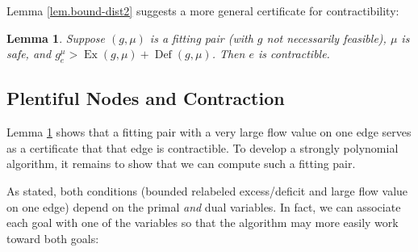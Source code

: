 \documentclass[11pt]{article}
\newtheorem{lemma}[theorem]{Lemma}
\theoremstyle{definition}
\theoremstyle{definition}
\theoremstyle{definition}
\DeclareMathOperator{\Ex}{Ex}
\DeclareMathOperator{\Def}{Def}
\begin{document}
    Lemma \ref{lem.bound-dist2} suggests a more general certificate for contractibility:
    \begin{lemma} \label{lem.contractibility}
    Suppose $(g, \mu)$ is a fitting pair (with $g$ not necessarily feasible),
    $\mu$ is safe, and $g^\mu_e > \Ex(g, \mu) + \Def(g, \mu)$.
    Then $e$ is contractible.
    \end{lemma}

%

	\subsection{Plentiful Nodes and Contraction}
    Lemma \ref{lem.contractibility} shows that a fitting pair with a very
    large flow value on one edge serves as a certificate that that edge is contractible.
    To develop a strongly polynomial algorithm, it remains to show that we can compute
    such a fitting pair.
    
    As stated, both conditions (bounded relabeled excess/deficit and
    large flow value on one edge)
    depend on the primal \emph{and} dual variables. In fact, we can associate each goal
    with one of the variables so that the algorithm may more easily work toward both goals:
    
\end{document}
